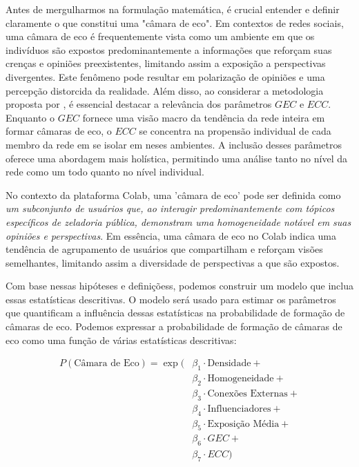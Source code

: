 Antes de mergulharmos na formulação matemática, é crucial entender e definir claramente o que constitui uma "câmara de eco". Em contextos de redes sociais, uma câmara de eco é frequentemente vista como um ambiente em que os indivíduos são expostos predominantemente a informações que reforçam suas crenças e opiniões preexistentes, limitando assim a exposição a perspectivas divergentes. Este fenômeno pode resultar em polarização de opiniões e uma percepção distorcida da realidade. Além disso, ao considerar a metodologia proposta por , é essencial destacar a relevância dos parâmetros $GEC$ e $ECC$. Enquanto o $GEC$ fornece uma visão macro da tendência da rede inteira em formar câmaras de eco, o $ECC$ se concentra na propensão individual de cada membro da rede em se isolar em neses ambientes. A inclusão desses parâmetros oferece uma abordagem mais holística, permitindo uma análise tanto no nível da rede como um todo quanto no nível individual.

No contexto da plataforma Colab, uma 'câmara de eco' pode ser definida como \textit{um subconjunto de usuários que, ao interagir predominantemente com tópicos específicos de zeladoria pública, demonstram uma homogeneidade notável em suas opiniões e perspectivas}. Em essência, uma câmara de eco no Colab indica uma tendência de agrupamento de usuários que compartilham e reforçam visões semelhantes, limitando assim a diversidade de perspectivas a que são expostos.

Com base nessas hipóteses e definiçõess, podemos construir um modelo que inclua essas estatísticas descritivas. O modelo será usado para estimar os parâmetros que quantificam a influência dessas estatísticas na probabilidade de formação de câmaras de eco. Podemos expressar a probabilidade de formação de câmaras de eco como uma função de várias estatísticas descritivas:

\begin{equation}
	\begin{split}
		P(\text{{Câmara de Eco}}) = \exp(&\beta_1 \cdot \text{{Densidade}} + \\
		&\beta_2 \cdot \text{{Homogeneidade}} + \\
		&\beta_3 \cdot \text{{Conexões Externas}} + \\
		&\beta_4 \cdot \text{{Influenciadores}} + \\
		&\beta_5 \cdot \text{{Exposição Média}} + \\
		&\beta_6 \cdot \text{{$GEC$}} + \\
		&\beta_7 \cdot \text{{$ECC$}})
	\end{split}
\end{equation}

